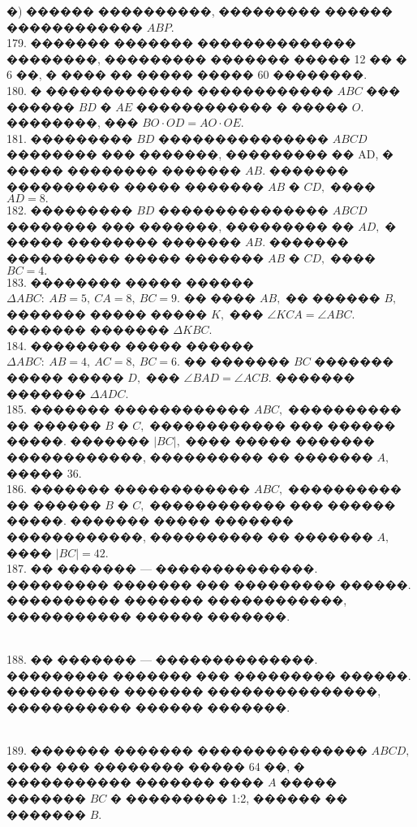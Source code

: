 \documentclass[12pt]{article}
\begin{document}
�) ������ ����������, ��������� ������ ������������ $ABP.$\\
179. ������� ������� �������������� ��������, ��������� ������� ����� 12 �� � 6 ��, � ���� �� ����� ����� 60 ��������.\\
180. � ������������� ������������ $ABC$ ��� ������ $BD$ � $AE$ ������������ � ����� $O.$ ��������, ��� $BO\cdot OD=AO\cdot OE.$\\
181. ��������� $BD$ ��������������� $ABCD$ �������� ��� �������, ��������� �� AD, � ����� �������� ������� $AB.$ ������� ���������� ����� ������� $AB$ � $CD,$ ���� $AD = 8.$\\
182. ��������� $BD$ ��������������� $ABCD$ �������� ��� �������, ��������� �� $AD,$ � ����� �������� ������� $AB.$ ������� ���������� ����� ������� $AB$ � $CD,$ ���� $BC = 4.$\\
183. �������� ����� ������ $\Delta ABC:\ AB = 5,\ CA = 8,\  BC = 9.$ �� ���� $AB,$ �� ������ $B,$ ������� ����� ����� $K,$ ��� $\angle KCA = \angle ABC.$ ������� ������� $\Delta KBC.$\\
184. �������� ����� ������ $\Delta ABC:\ AB = 4,\ AC = 8,\  BC = 6.$ �� ������� $BC$ ������� ����� ����� $D,$ ��� $\angle BAD = \angle ACB.$ ������� ������� $\Delta ADC.$\\
185. ������� ������������ $ABC,$ ���������� �� ������ $B$ � $C,$ ������������ ��� ������ �����. ������� $|BC|,$ ���� ����� ������� ������������, ���������� �� ������� $A,$ ����� 36.\\
186. ������� ������������ $ABC,$ ���������� �� ������ $B$ � $C,$ ������������ ��� ������ �����. ������� ����� ������� ������������, ���������� �� ������� $A,$ ���� $|BC| = 42.$\\
187. �� ������� --- ��������������. ��������� ������� ��� ��������� ������. ���������� ������� ������������, ����������� ������ �������.
\begin{figure}[ht!]
\end{figure}\\
188. �� ������� --- ��������������. ��������� ������� ��� ��������� ������. ���������� ������� ���������������, ����������� ������ �������.
\begin{figure}[ht!]
\end{figure}\\
189. ������� ������� ��������������� $ABCD,$ ���� ��� �������� ����� 64 ��, � ����������� ������� ���� $A$ ����� ������� $BC$ � ��������� 1:2, ������ �� ������� $B.$\\
\end{document}
